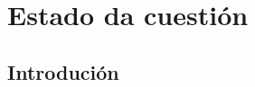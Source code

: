 %
%
\chapter[Estado da cuestión]{
	Estado da cuestión
	\label{ch.eda}
}

%
%
\section[Introdución]{
	Introdución}

